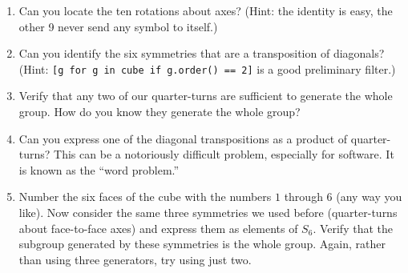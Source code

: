 \begin{enumerate}
%
\item  Can you locate the ten rotations about axes?  (Hint: the identity is easy, the other 9 never send any symbol to itself.)
%
\item Can you identify the six symmetries that are a transposition of diagonals?  (Hint: \verb?[g for g in cube if g.order() == 2]? is a good preliminary filter.)
%
\item Verify that any two of our quarter-turns are sufficient to generate the whole group.  How do you know they generate the whole group?
%
\item Can you express one of the diagonal transpositions as a product of quarter-turns?  This can be a notoriously difficult problem, especially for software.  It is known as the ``word problem.''
%
\item Number the six faces of the cube with the numbers $1$ through $6$ (any way you like).  Now consider the same three symmetries we used before (quarter-turns about face-to-face axes) and express them as elements of $S_6$.  Verify that the subgroup generated by these symmetries is the whole group.  Again, rather than using three generators, try using just two.
%
\end{enumerate}
%
\begin{sageverbatim}
\end{sageverbatim}
%

